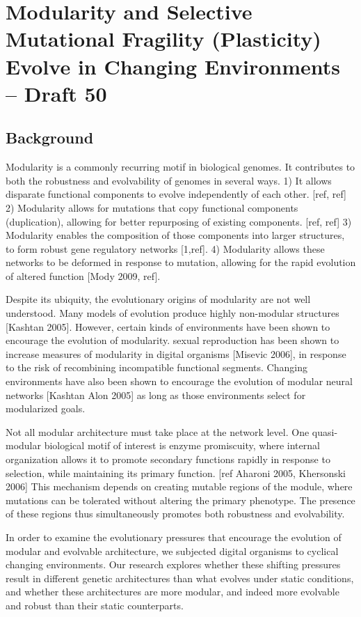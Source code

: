\section{Modularity and Selective Mutational Fragility (Plasticity) Evolve in Changing Environments  – Draft 50}
\subsection{Background}

Modularity is a commonly recurring motif in biological genomes. It contributes to both the robustness and evolvability of genomes in several ways. 1) It allows disparate functional components to evolve independently of each other. [ref, ref] 2) Modularity allows for mutations that copy functional components (duplication), allowing for better repurposing of existing components. [ref, ref] 3) Modularity enables the composition of those components into larger structures, to form robust gene regulatory networks [1,ref]. 4) Modularity allows these networks to be deformed in response to mutation, allowing for the rapid evolution of altered function [Mody 2009, ref].

Despite its ubiquity, the evolutionary origins of modularity are not well understood. Many models of evolution produce highly non-modular structures [Kashtan 2005]. However, certain kinds of environments have been shown to encourage the evolution of modularity. sexual reproduction has been shown to increase measures of modularity in digital organisms [Misevic 2006], in response to the risk of recombining incompatible functional segments. Changing environments have also been shown to encourage the evolution of modular neural networks [Kashtan Alon 2005] as long as those environments select for modularized goals. 

Not all modular architecture must take place at the network level. One quasi-modular biological motif of interest is enzyme promiscuity, where internal organization allows it to promote secondary functions rapidly in response to selection, while maintaining its primary function. [ref Aharoni 2005, Khersonski 2006] This mechanism depends on creating mutable regions of the module, where mutations can be tolerated without altering the primary phenotype. The presence of these regions thus simultaneously promotes both robustness and evolvability.

In order to examine the evolutionary pressures that encourage the evolution of modular and evolvable architecture, we subjected digital organisms to cyclical changing environments. Our research explores whether these shifting pressures result in different genetic architectures than what evolves under static conditions, and whether these architectures are more modular, and indeed more evolvable and robust than their static counterparts.